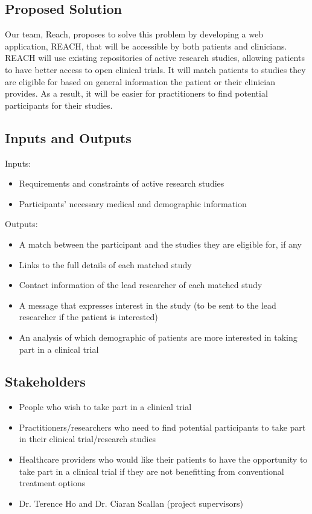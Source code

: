 \documentclass{article}
\begin{document}
\subsection{Proposed Solution}
Our team, Reach, proposes to solve this problem by developing a web application, REACH, that will be accessible by both patients 
and clinicians. REACH will use existing repositories of active research studies, allowing patients to have better access to open 
clinical trials. It will match patients to studies they are eligible for based on general information the patient or their clinician 
provides. As a result, it will be easier for practitioners to find potential participants for their studies.

\subsection{Inputs and Outputs}

Inputs:
\begin{itemize}
    \item Requirements and constraints of active research studies
    \item Participants' necessary medical and demographic information
\end{itemize}

\noindent Outputs:
\begin{itemize}
    \item A match between the participant and the studies they are eligible for, if any
    \item Links to the full details of each matched study
    \item Contact information of the lead researcher of each matched study
    \item A message that expresses interest in the study (to be sent to the lead researcher if the patient is interested)
    \item An analysis of which demographic of patients are more interested in taking part in a clinical trial
\end{itemize}

\subsection{Stakeholders}
\begin{itemize}
    \item People who wish to take part in a clinical trial
	\item Practitioners/researchers who need to find potential participants to take part in their clinical trial/research studies
	\item Healthcare providers who would like their patients to have the opportunity to take part in a clinical trial if they are not benefitting from conventional treatment options
    \item Dr. Terence Ho and Dr. Ciaran Scallan (project supervisors)
\end{itemize}
\end{document}
